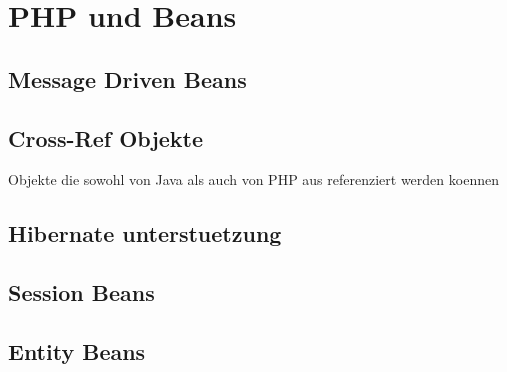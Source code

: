 \chapter{PHP und Beans}
\label{sec:chap3}


\section{Message Driven Beans}
\label{sec:chap3:mdb}

\section{Cross-Ref Objekte}
\label{sec:chap3:xref}
Objekte die sowohl von Java als auch von PHP aus
        referenziert werden koennen


\section{Hibernate unterstuetzung}
\label{sec:chap3:hib}

\section{Session Beans}
\label{sec:chap3:sb}

\section{Entity Beans}
\label{sec:chap3:eb}




